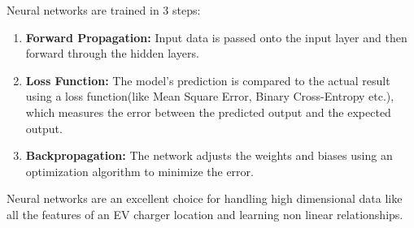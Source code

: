 Neural networks are trained in 3 steps:
\begin{enumerate}
    \item \textbf{Forward Propagation:} Input data is passed onto the input layer and then forward through the hidden layers.
    \item \textbf{Loss Function:} The model's prediction is compared to the actual result using a loss function(like Mean Square Error, Binary Cross-Entropy etc.), which measures the error between the predicted output and the expected output.
    \item \textbf{Backpropagation:} The network adjusts the weights and biases using an optimization algorithm to minimize the error.
\end{enumerate}
Neural networks are an excellent choice for handling high dimensional data like all the features of an EV charger location and learning non linear relationships.
